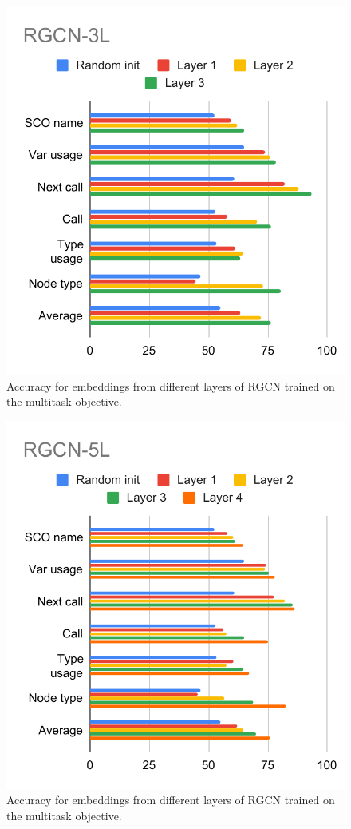 \documentclass[a4paper,twoside]{article}
\begin{document}
\begin{figure}[]
    \centering
    \includegraphics{RGCN-3L.pdf}
    \caption{Accuracy for embeddings from different layers of RGCN trained on the multitask objective.}\label{fig:rgcn_layers_3}
\end{figure}

\begin{figure}[]
    \centering
    \includegraphics{RGCN-5L.pdf}
    \caption{Accuracy for embeddings from different layers of RGCN trained on the multitask objective.}\label{fig:rgcn_layers_5}
\end{figure}
\end{document}
